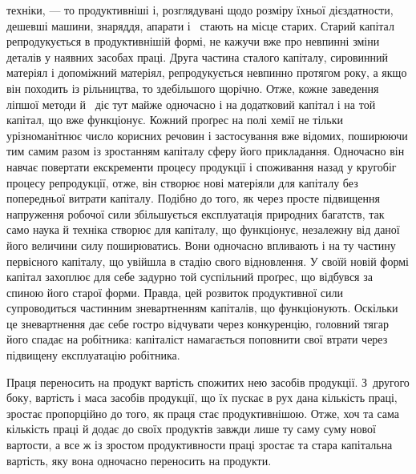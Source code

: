 \parcont{}  %
техніки, — то продуктивніші і, розглядувані щодо розміру
їхньої дієздатности, дешевші машини, знаряддя, апарати і~
стають на місце старих. Старий капітал репродукується в продуктивнішій
формі, не кажучи вже про невпинні зміни деталів
у наявних засобах праці. Друга частина сталого капіталу, сировинний
матеріял і допоміжний матеріял, репродукується невпинно
протягом року, а якщо він походить із рільництва, то здебільшого
щорічно. Отже, кожне заведення ліпшої методи й~
діє тут майже одночасно і на додатковий капітал і на той капітал,
що вже функціонує. Кожний проґрес на полі хемії не тільки урізноманітнює
число корисних речовин і застосування вже відомих,
поширюючи тим самим разом із зростанням капіталу сферу його
прикладання. Одночасно він навчає повертати екскременти процесу
продукції і споживання назад у кругобіг процесу репродукції,
отже, він створює нові матеріяли для капіталу без попередньої
витрати капіталу. Подібно до того, як через просте підвищення
напруження робочої сили збільшується експлуатація
природних багатств, так само наука й техніка створює для капіталу,
що функціонує, незалежну від даної його величини силу
поширюватись. Вони одночасно впливають і на ту частину первісного
капіталу, що увійшла в стадію свого відновлення. У своїй
новій формі капітал захоплює для себе задурно той суспільний
проґрес, що відбувся за спиною його старої форми. Правда, цей
розвиток продуктивної сили супроводиться частинним зневартненням
капіталів, що функціонують. Оскільки це зневартнення
дає себе гостро відчувати через конкуренцію, головний тягар
його спадає на робітника: капіталіст намагається поповнити свої
втрати через підвищену експлуатацію робітника.

Праця переносить на продукт вартість спожитих нею засобів
продукції. З~другого боку, вартість і маса засобів продукції,
що їх пускає в рух дана кількість праці, зростає пропорційно
до того, як праця стає продуктивнішою. Отже, хоч та сама кількість
праці й додає до своїх продуктів завжди лише ту саму суму
нової вартости, а все ж із зростом продуктивности праці зростає
та стара капітальна вартість, яку вона одночасно переносить
на продукти.

